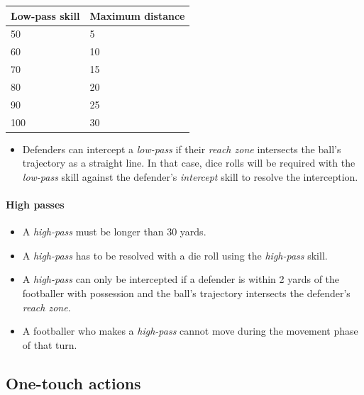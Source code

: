 \documentclass[12pt]{article}
\begin{document}
\begin{center}
\begin{tabular}{ll}
\toprule
\textbf{Low-pass skill} & \textbf{Maximum distance} \\
\midrule
50 & 5 \\
60 & 10 \\
70 & 15 \\
80 & 20 \\
90 & 25 \\
100 & 30 \\
\bottomrule
\end{tabular}
\end{center}

\begin{rulebox}
\begin{itemize}
\item Defenders can intercept a \emph{low-pass} if their \emph{reach zone} intersects the ball's trajectory as a straight line. In that case, dice rolls will be required with the \emph{low-pass} skill against the defender's \emph{intercept} skill to resolve the interception.
\end{itemize}
\end{rulebox}

\paragraph{High passes}

\begin{rulebox}
\begin{itemize}
\item A \emph{high-pass} must be longer than 30 yards.
\item A \emph{high-pass} has to be resolved with a die roll using the \emph{high-pass} skill.
\item A \emph{high-pass} can only be intercepted if a defender is within 2 yards of the footballer with possession and the ball's trajectory intersects the defender's \emph{reach zone}.
\item A footballer who makes a \emph{high-pass} cannot move during the movement phase of that turn.
\end{itemize}
\end{rulebox}

\subsection{One-touch actions}
\end{document}
